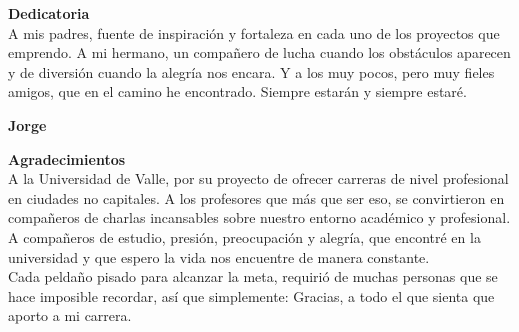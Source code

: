 \thispagestyle{fancy}
\setcounter{page}{5}
\Huge \textbf{Dedicatoria}\\[3.5cm]
\normalsize
A mis padres, fuente de inspiración y fortaleza en cada uno de los proyectos que emprendo. A mi hermano, un compañero de lucha cuando los obstáculos aparecen y de diversión cuando la alegría nos encara. Y a los muy pocos, pero muy fieles amigos, que en el camino he encontrado. Siempre estarán y siempre estaré.
\begin{flushright}
\textbf{Jorge} \end{flushright}
\newpage



\thispagestyle{fancy}
\Huge \textbf{Agradecimientos}\\[3.5cm]
\normalsize
A la Universidad de Valle, por su proyecto de ofrecer carreras de nivel profesional en ciudades no capitales. A los profesores que más que ser eso, se convirtieron en compañeros de charlas incansables sobre nuestro entorno académico y profesional.
\\
A compañeros de estudio, presión, preocupación y alegría, que encontré en la universidad y que espero la vida nos encuentre de manera constante.
\\
Cada peldaño pisado para alcanzar la meta, requirió de muchas personas que se hace imposible recordar, así que simplemente: Gracias, a todo el que sienta que aporto a mi carrera.
\\





